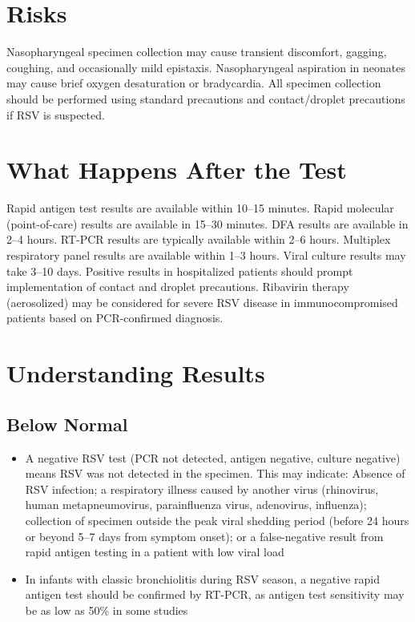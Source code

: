 \section*{Risks}
Nasopharyngeal specimen collection may cause transient discomfort, gagging, coughing, and occasionally mild epistaxis. Nasopharyngeal aspiration in neonates may cause brief oxygen desaturation or bradycardia. All specimen collection should be performed using standard precautions and contact/droplet precautions if RSV is suspected.

\section*{What Happens After the Test}
Rapid antigen test results are available within 10--15 minutes. Rapid molecular (point-of-care) results are available in 15--30 minutes. DFA results are available in 2--4 hours. RT-PCR results are typically available within 2--6 hours. Multiplex respiratory panel results are available within 1--3 hours. Viral culture results may take 3--10 days. Positive results in hospitalized patients should prompt implementation of contact and droplet precautions. Ribavirin therapy (aerosolized) may be considered for severe RSV disease in immunocompromised patients based on PCR-confirmed diagnosis.

\section*{Understanding Results}

\subsection*{Below Normal}
\begin{itemize}
  \item A negative RSV test (PCR not detected, antigen negative, culture negative) means RSV was not detected in the specimen. This may indicate: Absence of RSV infection; a respiratory illness caused by another virus (rhinovirus, human metapneumovirus, parainfluenza virus, adenovirus, influenza); collection of specimen outside the peak viral shedding period (before 24 hours or beyond 5--7 days from symptom onset); or a false-negative result from rapid antigen testing in a patient with low viral load
  \item In infants with classic bronchiolitis during RSV season, a negative rapid antigen test should be confirmed by RT-PCR, as antigen test sensitivity may be as low as 50\% in some studies
\end{itemize}

